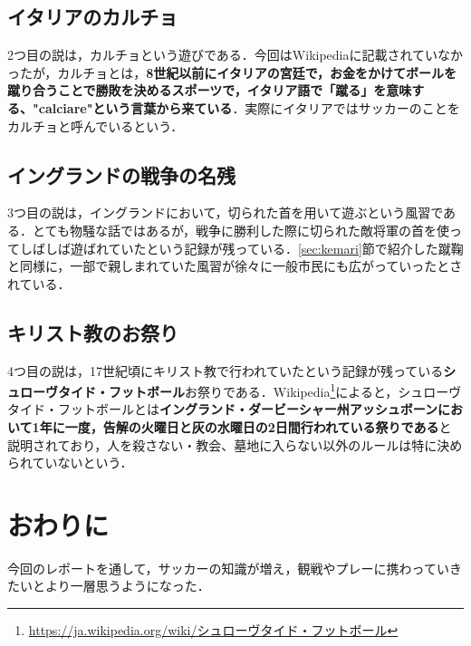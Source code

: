 \documentclass[a4paper]{ujarticle}
\begin{document}
        \subsection{イタリアのカルチョ}
            2つ目の説は，カルチョという遊びである．今回はWikipediaに記載されていなかったが，カルチョとは，\textbf{8世紀以前にイタリアの宮廷で，お金をかけてボールを蹴り合うことで勝敗を決めるスポーツで，イタリア語で「蹴る」を意味する、"calciare"という言葉から来ている}．実際にイタリアではサッカーのことをカルチョと呼んでいるという．

        \subsection{イングランドの戦争の名残}
            3つ目の説は，イングランドにおいて，切られた首を用いて遊ぶという風習である．とても物騒な話ではあるが，戦争に勝利した際に切られた敵将軍の首を使ってしばしば遊ばれていたという記録が残っている．\ref{sec:kemari}節で紹介した蹴鞠と同様に，一部で親しまれていた風習が徐々に一般市民にも広がっていったとされている．

        \subsection{キリスト教のお祭り}
            4つ目の説は，17世紀頃にキリスト教で行われていたという記録が残っている\textbf{シュローヴタイド・フットボール}お祭りである．Wikipedia\footnote{\url{https://ja.wikipedia.org/wiki/シュローヴタイド・フットボール}}によると，シュローヴタイド・フットボールとは\textbf{イングランド・ダービーシャー州アッシュボーンにおいて1年に一度，告解の火曜日と灰の水曜日の2日間行われている祭りである}と説明されており，人を殺さない・教会、墓地に入らない以外のルールは特に決められていないという．

    \section{おわりに}
        今回のレポートを通して，サッカーの知識が増え，観戦やプレーに携わっていきたいとより一層思うようになった．
\end{document}
